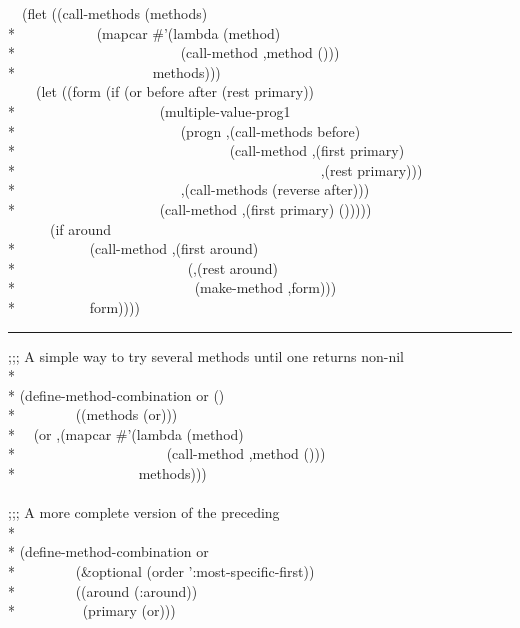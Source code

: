 \begin{defmac}
\begin{lisp}
~~(flet ((call-methods (methods) \\*
~~~~~~~~~~~(mapcar \#'(lambda (method) \\*
~~~~~~~~~~~~~~~~~~~~~~~{\Xbq}(call-method ,method ())) \\*
~~~~~~~~~~~~~~~~~~~methods))) \\
~~~~(let ((form (if (or before after (rest primary)) \\*
~~~~~~~~~~~~~~~~~~~~{\Xbq}(multiple-value-prog1 \\*
~~~~~~~~~~~~~~~~~~~~~~~(progn ,{\Xatsign}(call-methods before) \\*
~~~~~~~~~~~~~~~~~~~~~~~~~~~~~~(call-method ,(first primary) \\*
~~~~~~~~~~~~~~~~~~~~~~~~~~~~~~~~~~~~~~~~~~~,(rest primary))) \\*
~~~~~~~~~~~~~~~~~~~~~~~,{\Xatsign}(call-methods (reverse after))) \\*
~~~~~~~~~~~~~~~~~~~~{\Xbq}(call-method ,(first primary) ())))) \\
~~~~~~(if around \\*
~~~~~~~~~~{\Xbq}(call-method ,(first around) \\*
~~~~~~~~~~~~~~~~~~~~~~~~(,{\Xatsign}(rest around) \\*
~~~~~~~~~~~~~~~~~~~~~~~~~(make-method ,form))) \\*
~~~~~~~~~~form))))
\end{lisp}
\hrule width 0pt\relax
\begin{lisp}
;;; A simple way to try several methods until one returns non-nil \\*
\\*
(define-method-combination or () \\*
~~~~~~~~((methods (or))) \\*
~~{\Xbq}(or ,{\Xatsign}(mapcar \#'(lambda (method) \\*
~~~~~~~~~~~~~~~~~~~~~{\Xbq}(call-method ,method ())) \\*
~~~~~~~~~~~~~~~~~methods))) \\
\\
;;; A more complete version of the preceding \\*
\\*
(define-method-combination or  \\*
~~~~~~~~(\&optional (order ':most-specific-first)) \\*
~~~~~~~~((around (:around)) \\*
~~~~~~~~~(primary (or))) \\

\end{lisp}
\end{defmac}
